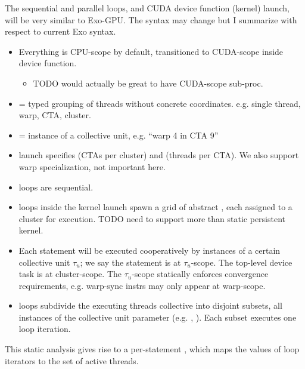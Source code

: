 
The sequential and parallel loops, and CUDA device function (kernel) launch, will be very similar to Exo-GPU.
The syntax may change but I summarize with respect to current Exo syntax.

\begin{itemize}
  \item Everything is CPU-scope by default, transitioned to CUDA-scope inside device function.
  \begin{itemize}
    \item TODO would actually be great to have CUDA-scope sub-proc.
  \end{itemize}
  \item {} = typed grouping of threads without concrete coordinates. e.g. single thread, warp, CTA, cluster.
  \item {} = instance of a collective unit, e.g. ``warp 4 in CTA 9''
  \item {} launch specifies  (CTAs per cluster) and  (threads per CTA). We also support warp specialization, not important here.
  \item {} loops are sequential.
  \item {} loops inside the kernel launch spawn a grid of abstract , each assigned to a cluster for execution. TODO need to support more than static persistent kernel.
  \item Each statement will be executed cooperatively by instances of a certain collective unit $\tau_u$; we say the statement is at $\tau_u$-scope.
    The top-level device task is at cluster-scope.
    The $\tau_u$-scope statically enforces convergence requirements, e.g. warp-sync instrs may only appear at warp-scope.
  \item {} loops subdivide the executing threads collective into disjoint subsets, all instances of the  collective unit parameter (e.g. , ).
  Each subset executes one loop iteration. 
\end{itemize}

This static analysis gives rise to a per-statement , which maps the values of loop iterators to the set of active threads.


